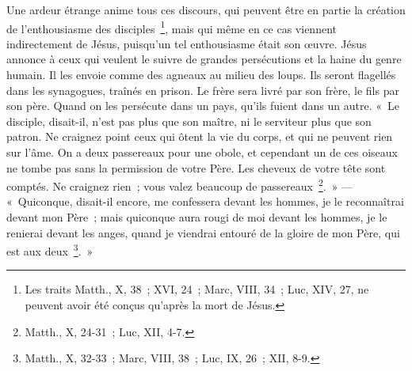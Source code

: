 \documentclass[french,twoside]{book} %
\begin{document}
Une ardeur étrange anime tous ces discours, qui peuvent être en partie la création de l’enthousiasme des disciples \footnote{Les traits Matth., X, 38 ; XVI, 24 ; Marc, VIII, 34 ; Luc, XIV, 27, ne peuvent avoir été conçus qu’après la mort de Jésus.}, mais qui même en ce cas viennent indirectement de Jésus, puisqu’un tel enthousiasme était son œuvre. Jésus annonce à ceux qui veulent le suivre de grandes persécutions et la haine du genre humain. Il les envoie comme des agneaux au milieu des loups. Ils seront flagellés dans les synagogues, traînés en prison. Le frère sera livré par son frère, le fils par son père. Quand on les persécute dans un pays, qu’ils fuient dans un autre. « Le disciple, disait-il, n’est pas plus que son maître, ni le serviteur plus que son patron. Ne craignez point ceux qui ôtent la vie du corps, et qui ne peuvent rien sur l’âme. On a deux passereaux pour une obole, et cependant un de ces oiseaux ne tombe pas sans la permission de votre Père. Les cheveux de votre tête sont comptés. Ne craignez rien ; vous valez beaucoup de passereaux \footnote{Matth., X, 24-31 ; Luc, XII, 4-7.}. » — « Quiconque, disait-il encore, me confessera devant les hommes, je le reconnaîtrai devant mon Père ; mais quiconque aura rougi de moi devant les hommes, je le renierai devant les anges, quand je viendrai entouré de la gloire de mon Père, qui est aux deux \footnote{Matth., X, 32-33 ; Marc, VIII, 38 ; Luc, IX, 26 ; XII, 8-9.}. »\par
\end{document}
